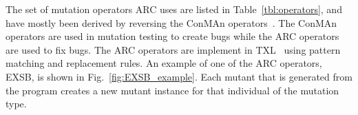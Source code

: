 The set of mutation operators ARC uses are listed in Table~\ref{tbl:operators},
and have mostly been derived by reversing the ConMAn operators~\cite{BCD06}. The ConMAn operators are used in mutation testing to create bugs while the ARC operators are used to fix bugs. The ARC operators are implement in 
TXL~\cite{CHP91} using pattern matching and replacement rules. An example of one of the ARC operators, 
EXSB, is shown in Fig.~\ref{fig:EXSB_example}. Each mutant
that is generated from the program creates a new mutant instance for that
individual of the mutation type.




